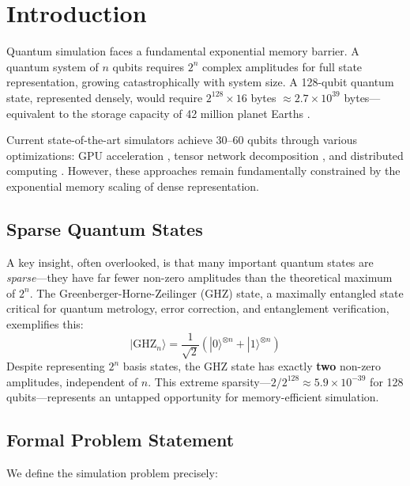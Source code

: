 \documentclass[11pt,twocolumn]{article}
\begin{document}
\section{Introduction}

Quantum simulation faces a fundamental exponential memory barrier. A quantum system of $n$ qubits requires $2^n$ complex amplitudes for full state representation, growing catastrophically with system size. A 128-qubit quantum state, represented densely, would require $2^{128} \times 16$ bytes $\approx 2.7 \times 10^{39}$ bytes---equivalent to the storage capacity of 42 million planet Earths \cite{preskill2018quantum}.

Current state-of-the-art simulators achieve 30--60 qubits through various optimizations: GPU acceleration \cite{qiskit2024}, tensor network decomposition \cite{alibaba2023}, and distributed computing \cite{google2019}. However, these approaches remain fundamentally constrained by the exponential memory scaling of dense representation.

\subsection{Sparse Quantum States}

A key insight, often overlooked, is that many important quantum states are \emph{sparse}---they have far fewer non-zero amplitudes than the theoretical maximum of $2^n$. The Greenberger-Horne-Zeilinger (GHZ) state, a maximally entangled state critical for quantum metrology, error correction, and entanglement verification, exemplifies this:
\begin{equation}
    |\text{GHZ}_n\rangle = \frac{1}{\sqrt{2}}\left(|0\rangle^{\otimes n} + |1\rangle^{\otimes n}\right)
\end{equation}
Despite representing $2^n$ basis states, the GHZ state has exactly \textbf{two} non-zero amplitudes, independent of $n$. This extreme sparsity---$2/2^{128} \approx 5.9 \times 10^{-39}$ for 128 qubits---represents an untapped opportunity for memory-efficient simulation.

\subsection{Formal Problem Statement}

We define the simulation problem precisely:
\end{document}
